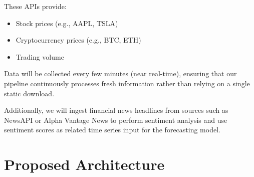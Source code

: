 \documentclass[a4paper,12pt]{article}
\begin{document}
These APIs provide:
\begin{itemize}[leftmargin=1.2em]
    \item Stock prices (e.g., AAPL, TSLA)
    \item Cryptocurrency prices (e.g., BTC, ETH)
    \item Trading volume
\end{itemize}

Data will be collected every few minutes (near real-time), ensuring that our pipeline continuously processes fresh information rather than relying on a single static download.

Additionally, we will ingest financial news headlines from sources such as NewsAPI or Alpha Vantage News to perform sentiment analysis and use sentiment scores as related time series input for the forecasting model.

\section{Proposed Architecture}
\end{document}

